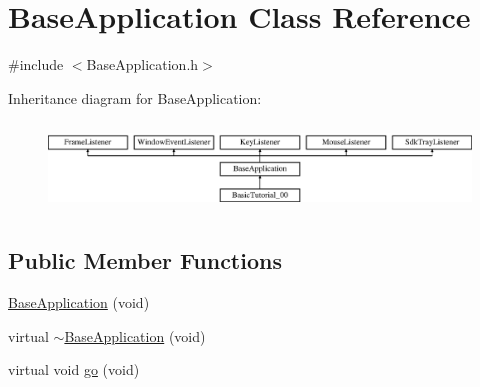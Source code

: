 \hypertarget{class_base_application}{}\section{Base\+Application Class Reference}
\label{class_base_application}


{\ttfamily \#include $<$Base\+Application.\+h$>$}

Inheritance diagram for Base\+Application\+:\begin{figure}[H]
\begin{center}
\leavevmode
\includegraphics[height=2.382979cm]{class_base_application}
\end{center}
\end{figure}
\subsection*{Public Member Functions}
\begin{DoxyCompactItemize}
\item 
\mbox{\hyperlink{class_base_application_a7c897f08816cc064568ae1ec71026719}{Base\+Application}} (void)
\item 
virtual \mbox{\hyperlink{class_base_application_a48e1966307d5ef8f6cbf8b6e980ad652}{$\sim$\+Base\+Application}} (void)
\item 
virtual void \mbox{\hyperlink{class_base_application_a8a14a65a29118dd75173aa68678a05e1}{go}} (void)
\end{DoxyCompactItemize}
